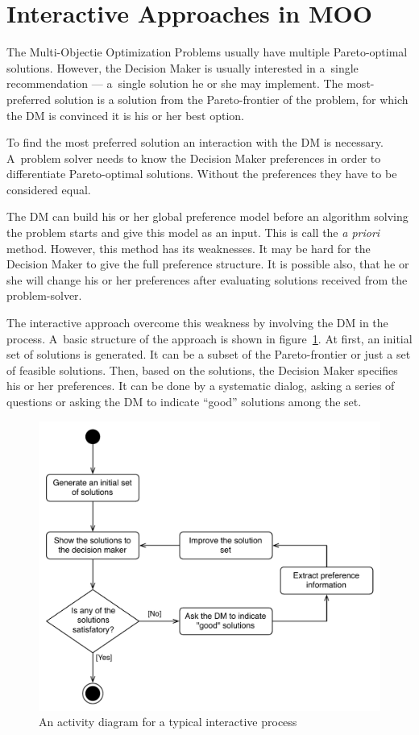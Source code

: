 \section{Interactive Approaches in MOO}
\label{sec_ia_in_moo}

The Multi-Objectie Optimization Problems usually have multiple Pareto-optimal
solutions. However, the Decision Maker is usually interested in a~single
recommendation --- a~single solution he or she may implement. The
most-preferred solution is a solution from the Pareto-frontier of the problem,
for which the DM is convinced it is his or her best option.

To find the most preferred solution an interaction with the DM is
necessary. A~problem solver needs to know the Decision Maker preferences in
order to differentiate Pareto-optimal solutions. Without the preferences they
have to be considered equal.

The DM can build his or her global preference model before an algorithm
solving the problem starts and give this model as an input. This is call the
\textit{a priori} method. However, this method has its weaknesses. It may be
hard for the Decision Maker to give the full preference structure. It is
possible also, that he or she will change his or her preferences after
evaluating solutions received from the problem-solver. 

The interactive approach overcome this weakness by involving the DM in the
process. A~basic structure of the approach is shown in
figure~\ref{imoprocess_uml}. At first, an initial set of solutions is
generated. It can be a subset of the Pareto-frontier or just a set of feasible
solutions. Then, based on the solutions, the Decision Maker specifies his or
her preferences. It can be done by a systematic dialog, asking a series of
questions or asking the DM to indicate ``good'' solutions among the set.

\begin{figure}
  \centering \includegraphics[scale=0.65]{img/imoprocess_uml}
  \caption{An activity diagram for a typical interactive process}
  \label{imoprocess_uml}
\end{figure}

